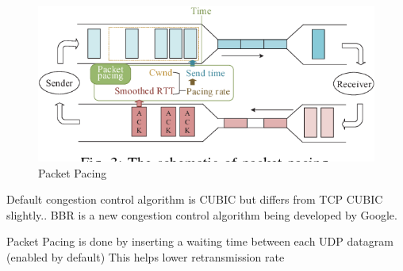 \begin{frame}
    
        \begin{figure}[!ht]
        \centering
        \includegraphics[width=1\textwidth]
        {figures/pacing.png}
        \endminipage\hfill
        \caption{\label{fig:pacing}Packet Pacing \cite{DBLP:conf/ipccc/YuXY17}}
    \end{figure}

Default congestion control algorithm is CUBIC\cite{DBLP:journals/internet/CuiLLWK17} but differs from TCP CUBIC slightly.\cite{quicgd}\cite{ietf-quic-recovery-18}. BBR is a new congestion control algorithm being developed by Google.\cite{DBLP:conf/pam/LiCJC18}

Packet Pacing is done by inserting a waiting time between each UDP datagram (enabled by default)
This helps lower retransmission rate \cite{DBLP:conf/infocom/AggarwalSA00}

\end{frame}
\clearpage

